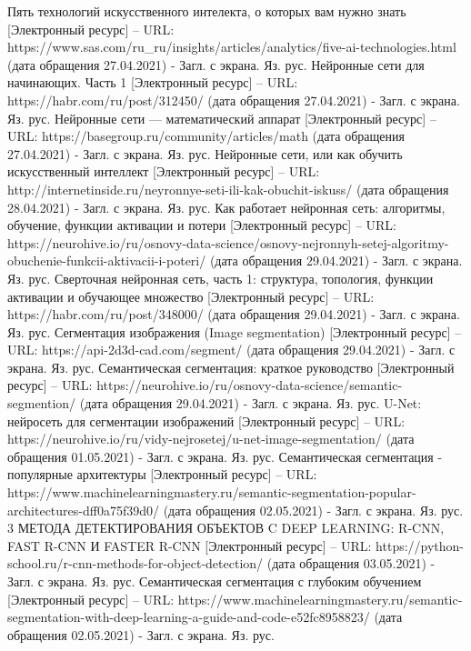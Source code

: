 \documentclass[bachelor, och, coursework]{shiza}
\begin{document}
\begin{thebibliography}{3}
    Пять технологий искусственного интелекта, о которых вам нужно знать [Электронный ресурс] – URL: https://www.sas.com/ru_ru/insights/articles/analytics/five-ai-technologies.html (дата обращения 27.04.2021) - Загл. с экрана. Яз. рус.
    Нейронные сети для начинающих. Часть 1 [Электронный ресурс] – URL: https://habr.com/ru/post/312450/ (дата обращения 27.04.2021) - Загл. с экрана. Яз. рус.
    Нейронные сети — математический аппарат [Электронный ресурс] – URL: https://basegroup.ru/community/articles/math (дата обращения 27.04.2021) - Загл. с экрана. Яз. рус.
    Нейронные сети, или как обучить искусственный интеллект [Электронный ресурс] – URL: http://internetinside.ru/neyronnye-seti-ili-kak-obuchit-iskuss/ (дата обращения 28.04.2021) - Загл. с экрана. Яз. рус.
    Как работает нейронная сеть: алгоритмы, обучение, функции активации и потери [Электронный ресурс] – URL: https://neurohive.io/ru/osnovy-data-science/osnovy-nejronnyh-setej-algoritmy-obuchenie-funkcii-aktivacii-i-poteri/ (дата обращения 29.04.2021) - Загл. с экрана. Яз. рус.
    Сверточная нейронная сеть, часть 1: структура, топология, функции активации и обучающее множество [Электронный ресурс] – URL: https://habr.com/ru/post/348000/ (дата обращения 29.04.2021) - Загл. с экрана. Яз. рус.
    Сегментация изображения (Image segmentation) [Электронный ресурс] – URL: https://api-2d3d-cad.com/segment/ (дата обращения 29.04.2021) - Загл. с экрана. Яз. рус.
    Семантическая сегментация: краткое руководство [Электронный ресурс] – URL: https://neurohive.io/ru/osnovy-data-science/semantic-segmention/ (дата обращения 29.04.2021) - Загл. с экрана. Яз. рус.
    U-Net: нейросеть для сегментации изображений [Электронный ресурс] – URL: https://neurohive.io/ru/vidy-nejrosetej/u-net-image-segmentation/ (дата обращения 01.05.2021) - Загл. с экрана. Яз. рус.
    Семантическая сегментация - популярные архитектуры [Электронный ресурс] – URL: https://www.machinelearningmastery.ru/semantic-segmentation-popular-architectures-dff0a75f39d0/ (дата обращения 02.05.2021) - Загл. с экрана. Яз. рус.
    3 МЕТОДА ДЕТЕКТИРОВАНИЯ ОБЪЕКТОВ C DEEP LEARNING: R-CNN, FAST R-CNN И FASTER R-CNN [Электронный ресурс] – URL: https://python-school.ru/r-cnn-methods-for-object-detection/ (дата обращения 03.05.2021) - Загл. с экрана. Яз. рус.
    Семантическая сегментация с глубоким обучением [Электронный ресурс] – URL: https://www.machinelearningmastery.ru/semantic-segmentation-with-deep-learning-a-guide-and-code-e52fc8958823/ (дата обращения 02.05.2021) - Загл. с экрана. Яз. рус.
    
\end{thebibliography}
\end{document}
